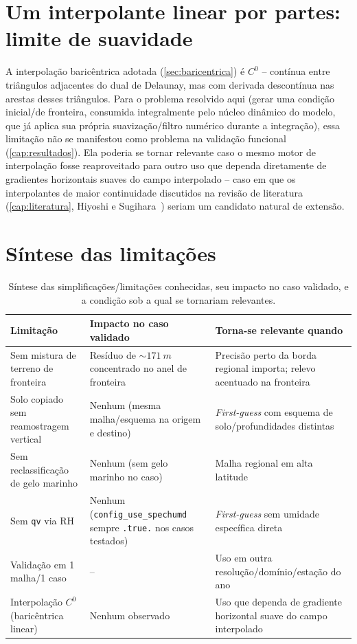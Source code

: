 \section{Um interpolante linear por partes: limite de suavidade}

A interpolação baricêntrica adotada (\cref{sec:baricentrica}) é
$C^0$ -- contínua entre triângulos adjacentes do dual de Delaunay, mas
com derivada descontínua nas arestas desses triângulos. Para o problema
resolvido aqui (gerar uma condição inicial/de fronteira, consumida
integralmente pelo núcleo dinâmico do modelo, que já aplica sua própria
suavização/filtro numérico durante a integração), essa limitação não se
manifestou como problema na validação funcional (\cref{cap:resultados}).
Ela poderia se tornar relevante caso o mesmo motor de interpolação fosse
reaproveitado para outro uso que dependa diretamente de gradientes
horizontais suaves do campo interpolado -- caso em que os interpolantes
de maior continuidade discutidos na revisão de literatura
(\cref{cap:literatura}, Hiyoshi e Sugihara~\cite{hiyoshi2000continuity})
seriam um candidato natural de extensão.

\section{Síntese das limitações}

\begin{table}[H]
\centering
\caption{Síntese das simplificações/limitações conhecidas, seu impacto
  no caso validado, e a condição sob a qual se tornariam relevantes.}
\label{tab:limitacoes}
\small
\begin{tabular}{@{}p{4.3cm}p{3.6cm}p{5.2cm}@{}}
\toprule
Limitação & Impacto no caso validado & Torna-se relevante quando \\
\midrule
Sem mistura de terreno de fronteira & Resíduo de $\sim\SI{171}{m}$ concentrado no anel de fronteira & Precisão perto da borda regional importa; relevo acentuado na fronteira \\
Solo copiado sem reamostragem vertical & Nenhum (mesma malha/esquema na origem e destino) & \textit{First-guess} com esquema de solo/profundidades distintas \\
Sem reclassificação de gelo marinho & Nenhum (sem gelo marinho no caso) & Malha regional em alta latitude \\
Sem \texttt{qv} via RH & Nenhum (\texttt{config\_use\_spechumd} sempre \texttt{.true.} nos casos testados) & \textit{First-guess} sem umidade específica direta \\
Validação em 1 malha/1 caso & -- & Uso em outra resolução/domínio/estação do ano \\
Interpolação $C^0$ (baricêntrica linear) & Nenhum observado & Uso que dependa de gradiente horizontal suave do campo interpolado \\
\bottomrule
\end{tabular}
\end{table}

